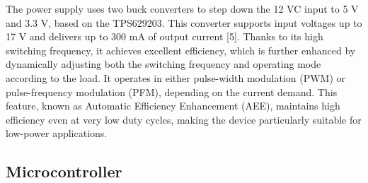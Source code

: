 
The power supply uses two buck converters to step down the 12 VC input to 5 V and 3.3 V, based on the TPS629203. 
This converter supports input voltages up to 17 V and delivers up to 300 mA of output current [5].
Thanks to its high switching frequency, it achieves excellent efficiency, which is further enhanced by dynamically adjusting both the switching frequency and operating mode according to the load.
It operates in either pulse-width modulation (PWM) or pulse-frequency modulation (PFM), depending on the current demand. This feature, known as Automatic Efficiency Enhancement (AEE), maintains high efficiency even at very low duty cycles, making the device particularly suitable for low-power applications.

\subsection{Microcontroller}


